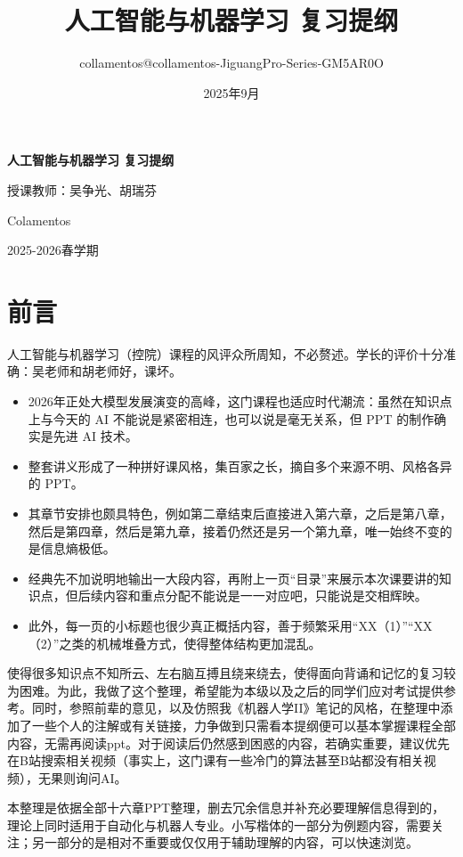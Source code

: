 \documentclass[a4paper,11pt]{article}
\title{人工智能与机器学习 复习提纲 \\ \vspace{0.5cm} \large }
\author{collamentos@collamentos-JiguangPro-Series-GM5AR0O}
\date{2025年9月}
\begin{document}
\begin{titlepage}
    \centering
    \vspace*{3cm}
    {\Huge \textbf{人工智能与机器学习 复习提纲} \par}
    \vspace{0.5cm}
    {\Large 授课教师：吴争光、胡瑞芬\par}
    \vspace{3cm}
    {\Large Colamentos \par}
    {\Large 2025-2026春学期 \par}
\end{titlepage}

\section*{前言}

人工智能与机器学习（控院）课程的风评众所周知，不必赘述。学长的评价十分准确：吴老师和胡老师好，课坏。
\begin{itemize}[itemsep=0.2em, topsep=0.2em, parsep=0pt, partopsep=0pt]
    \item 2026年正处大模型发展演变的高峰，这门课程也适应时代潮流：虽然在知识点上与今天的 AI 不能说是紧密相连，也可以说是毫无关系，但 PPT 的制作确实是先进 AI 技术。
    \item 整套讲义形成了一种拼好课风格，集百家之长，摘自多个来源不明、风格各异的 PPT。
    \item 其章节安排也颇具特色，例如第二章结束后直接进入第六章，之后是第八章，然后是第四章，然后是第九章，接着仍然还是另一个第九章，唯一始终不变的是信息熵极低。
    \item 经典先不加说明地输出一大段内容，再附上一页“目录”来展示本次课要讲的知识点，但后续内容和重点分配不能说是一一对应吧，只能说是交相辉映。
    \item 此外，每一页的小标题也很少真正概括内容，善于频繁采用“XX（1）”“XX（2）”之类的机械堆叠方式，使得整体结构更加混乱。
\end{itemize}

使得很多知识点不知所云、左右脑互搏且绕来绕去，使得面向背诵和记忆的复习较为困难。为此，我做了这个整理，希望能为本级以及之后的同学们应对考试提供参考。同时，参照前辈的意见，以及仿照我《机器人学II》笔记的风格，在整理中添加了一些个人的注解或有关链接，力争做到只需看本提纲便可以基本掌握课程全部内容，无需再阅读ppt。对于阅读后仍然感到困惑的内容，若确实重要，建议优先在B站搜索相关视频（事实上，这门课有一些冷门的算法甚至B站都没有相关视频），无果则询问AI。

本整理是依据全部十六章PPT整理，删去冗余信息并补充必要理解信息得到的，理论上同时适用于自动化与机器人专业。小写楷体的一部分为例题内容，需要关注；另一部分的是相对不重要或仅仅用于辅助理解的内容，可以快速浏览。
\end{document}
